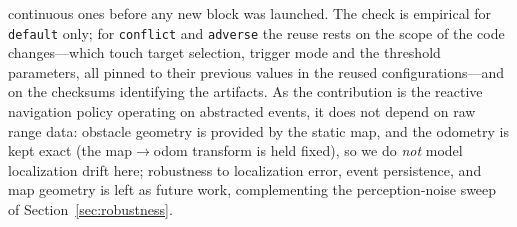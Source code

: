 continuous ones before any new block was launched. The check is empirical for
\texttt{default} only; for \texttt{conflict} and \texttt{adverse} the reuse rests on
the scope of the code changes---which touch target selection, trigger mode and the
threshold parameters, all pinned to their previous values in the reused
configurations---and on the checksums identifying the artifacts. As the contribution is the reactive
navigation policy operating on abstracted events, it does not depend on raw range
data: obstacle geometry is provided by the static map, and the odometry is kept
exact (the map$\rightarrow$odom transform is held fixed), so we do \emph{not}
model localization drift here; robustness to localization error, event
persistence, and map geometry is left as future work, complementing the
perception-noise sweep of Section~\ref{sec:robustness}.
